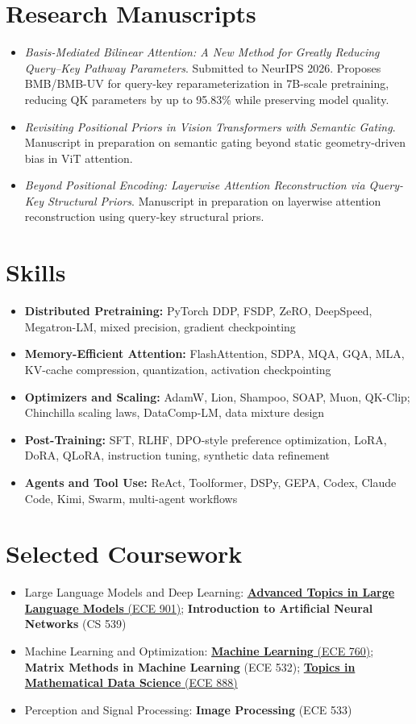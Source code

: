 \documentclass[10pt]{article}
\newcommand{\resumesection}[1]{\section*{#1}}
\newcommand{\course}[2]{\textbf{#1} (#2)}
\newcommand{\coursehref}[3]{\href{\detokenize{#3}}{\textbf{#1} (#2)}}
\begin{document}
\resumesection{Research Manuscripts}

\begin{itemize}
    \item \textit{Basis-Mediated Bilinear Attention: A New Method for Greatly Reducing Query--Key Pathway Parameters}. Submitted to NeurIPS 2026. Proposes BMB/BMB-UV for query-key reparameterization in 7B-scale pretraining, reducing QK parameters by up to 95.83\% while preserving model quality.
    \item \textit{Revisiting Positional Priors in Vision Transformers with Semantic Gating}. Manuscript in preparation on semantic gating beyond static geometry-driven bias in ViT attention.
    \item \textit{Beyond Positional Encoding: Layerwise Attention Reconstruction via Query-Key Structural Priors}. Manuscript in preparation on layerwise attention reconstruction using query-key structural priors.
\end{itemize}

\resumesection{Skills}

\begin{itemize}
    \item \textbf{Distributed Pretraining:} PyTorch DDP, FSDP, ZeRO, DeepSpeed, Megatron-LM, mixed precision, gradient checkpointing
    \item \textbf{Memory-Efficient Attention:} FlashAttention, SDPA, MQA, GQA, MLA, KV-cache compression, quantization, activation checkpointing
    \item \textbf{Optimizers and Scaling:} AdamW, Lion, Shampoo, SOAP, Muon, QK-Clip; Chinchilla scaling laws, DataComp-LM, data mixture design
    \item \textbf{Post-Training:} SFT, RLHF, DPO-style preference optimization, LoRA, DoRA, QLoRA, instruction tuning, synthetic data refinement
    \item \textbf{Agents and Tool Use:} ReAct, Toolformer, DSPy, GEPA, Codex, Claude Code, Kimi, Swarm, multi-agent workflows
\end{itemize}

\resumesection{Selected Coursework}

\begin{itemize}
    \item Large Language Models and Deep Learning: \coursehref{Advanced Topics in Large Language Models}{ECE 901}{https://kangwooklee.com/901_advanced_topics_in_LLMs/}; \course{Introduction to Artificial Neural Networks}{CS 539}
    \item Machine Learning and Optimization: \coursehref{Machine Learning}{ECE 760}{https://pages.cs.wisc.edu/~khodak/cs760fall2025/\#policies}; \course{Matrix Methods in Machine Learning}{ECE 532}; \coursehref{Topics in Mathematical Data Science}{ECE 888}{https://sites.google.com/wisc.edu/888-2025?pli=1}
    \item Perception and Signal Processing: \course{Image Processing}{ECE 533}
\end{itemize}
\end{document}
